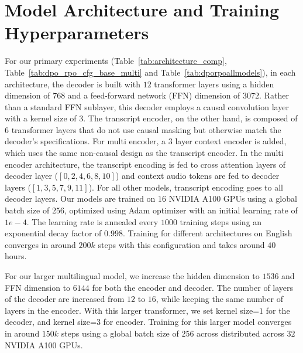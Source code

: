 \section{Model Architecture and Training Hyperparameters}
\label{sec:trainingdetails}
For our primary experiments (Table~\ref{tab:architecture_comp}, Table~\ref{tab:dpo_rpo_cfg_base_multi} and Table~\ref{tab:dporpoallmodels}), in each architecture, the decoder is built with $12$ transformer layers using a hidden dimension of $768$ and a feed-forward network (FFN) dimension of $3072$. Rather than a standard FFN sublayer, this decoder employs a causal convolution layer with a kernel size of $3$. The transcript encoder, on the other hand, is composed of $6$ transformer layers that do not use causal masking but otherwise match the decoder's specifications. For multi encoder, a $3$ layer context encoder is added, which uses the same non-causal design as the transcript encoder. In the multi encoder architecture, the transcript encoding is fed to cross attention layers of decoder layer ($[0,2,4,6,8,10]$) and context audio tokens are fed to decoder layers ($[1,3,5,7,9,11]$). For all other models, transcript encoding goes to all decoder layers. Our models are trained on $16$ NVIDIA A100 GPUs using a global batch size of $256$, optimized using Adam optimizer with an initial learning rate of $1e-4$. The learning rate is annealed every $1000$ training steps using an exponential decay factor of $0.998$. 
Training for different architectures on English converges in around $200k$ steps with this configuration and takes around $40$ hours. 

For our larger multilingual model, we increase the hidden dimension to $1536$ and FFN dimension to $6144$ for both the encoder and decoder. The number of layers of the decoder are increased from $12$ to $16$, while keeping the same number of layers in the encoder. 
With this larger transformer, we set kernel size=$1$ for the decoder, and kernel size=$3$ for encoder. Training for this larger model converges in around $150k$ steps using a global batch size of $256$ across distributed across $32$ NVIDIA A100 GPUs.









